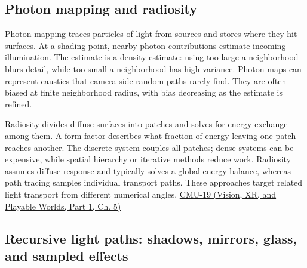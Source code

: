 \subsection{Photon mapping and radiosity}\label{03-visual-computing-i-ch011-photon-mapping-and-radiosity}

\hypertarget{03-visual-computing-i-ch011-photon-mapping-and-radiosity}{}

Photon mapping traces particles of light from sources and stores where they hit surfaces. At a shading point, nearby photon contributions estimate incoming illumination. The estimate is a density estimate: using too large a neighborhood blurs detail, while too small a neighborhood has high variance. Photon maps can represent caustics that camera-side random paths rarely find. They are often biased at finite neighborhood radius, with bias decreasing as the estimate is refined.

Radiosity divides diffuse surfaces into patches and solves for energy exchange among them. A form factor describes what fraction of energy leaving one patch reaches another. The discrete system couples all patches; dense systems can be expensive, while spatial hierarchy or iterative methods reduce work. Radiosity assumes diffuse response and typically solves a global energy balance, whereas path tracing samples individual transport paths. These approaches target related light transport from different numerical angles. \href{../07-Vision-XR-and-Playable-Worlds-P01/main.pdf\#04-visual-computing-ii-ch036-cmu-19---variance-reduction}{CMU-19 (Vision, XR, and Playable Worlds, Part 1, Ch. 5)}

\subsection{Recursive light paths: shadows, mirrors, glass, and sampled effects}\label{03-visual-computing-i-ch011-recursive-light-paths-shadows-mirrors-glass-and-sampled-effects}

\hypertarget{03-visual-computing-i-ch011-recursive-light-paths-shadows-mirrors-glass-and-sampled-effects}{}

